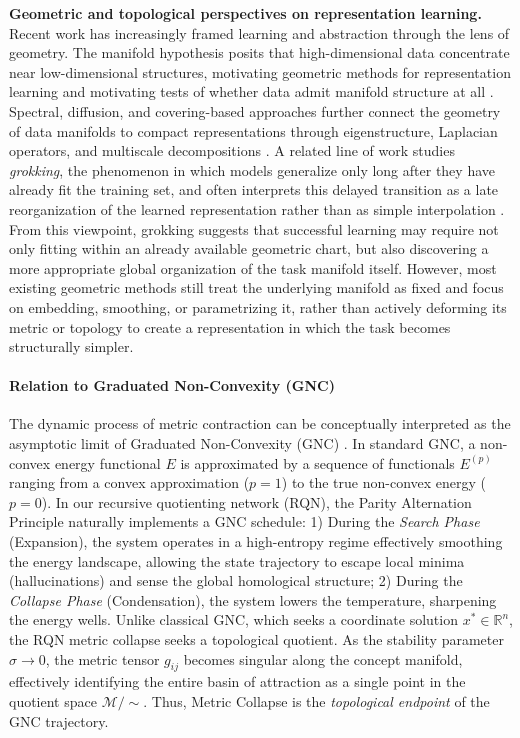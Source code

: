 \documentclass{article}
\begin{document}
\noindent\textbf{Geometric and topological perspectives on representation learning.}
Recent work has increasingly framed learning and abstraction through the lens of geometry.
The manifold hypothesis posits that high-dimensional data concentrate near low-dimensional structures, motivating geometric methods for representation learning and motivating tests of whether data admit manifold structure at all \cite{tenenbaum2000global,fefferman2016testing}.
Spectral, diffusion, and covering-based approaches further connect the geometry of data manifolds to compact representations through eigenstructure, Laplacian operators, and multiscale decompositions \cite{chung1997spectral,mahadevan2005proto,belkin2008towards}.
A related line of work studies \emph{grokking}, the phenomenon in which models generalize only long after they have already fit the training set, and often interprets this delayed transition as a late reorganization of the learned representation rather than as simple interpolation \cite{power2022grokking,liu2022understanding,kumar2023grokking}.
From this viewpoint, grokking suggests that successful learning may require not only fitting within an already available geometric chart, but also discovering a more appropriate global organization of the task manifold itself.
However, most existing geometric methods still treat the underlying manifold as fixed and focus on embedding, smoothing, or parametrizing it, rather than actively deforming its metric or topology to create a representation in which the task becomes structurally simpler.
 
\paragraph{Relation to Graduated Non-Convexity (GNC)}
The dynamic process of metric contraction can be conceptually interpreted as the asymptotic limit of Graduated Non-Convexity (GNC) \cite{blake1987visual}. In standard GNC, a non-convex energy functional $E$ is approximated by a sequence of functionals $E^{(p)}$ ranging from a convex approximation ($p=1$) to the true non-convex energy ($p=0$).
In our recursive quotienting network (RQN), the Parity Alternation Principle naturally implements a GNC schedule:
1) During the \textit{Search Phase} (Expansion), the system operates in a high-entropy regime effectively smoothing the energy landscape, allowing the state trajectory to escape local minima (hallucinations) and sense the global homological structure;
2) During the \textit{Collapse Phase} (Condensation), the system lowers the temperature, sharpening the energy wells.
Unlike classical GNC, which seeks a coordinate solution $x^* \in \mathbb{R}^n$, the RQN metric collapse seeks a topological quotient. As the stability parameter $\sigma \to 0$, the metric tensor $g_{ij}$ becomes singular along the concept manifold, effectively identifying the entire basin of attraction as a single point in the quotient space $\mathcal{M}/\sim$. Thus, Metric Collapse is the \textit{topological endpoint} of the GNC trajectory.
 
\end{document}
